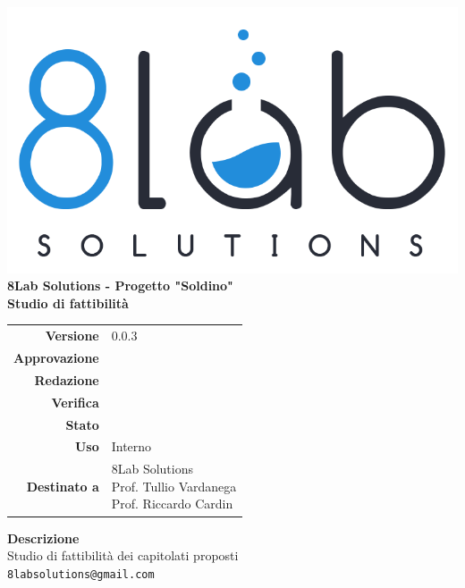 \thispagestyle{empty}
\begin{titlepage}
	\begin{center}
		\includegraphics[scale = 0.3]{images/logo8_crop.png}\\
		\large \textbf{8Lab Solutions - Progetto "Soldino"} \\
		\vfill
		\Huge \textbf{Studio di fattibilità}
		\vspace*{\fill}
        
        \vfill
        \large
        \begin{tabular}{r|l}
                        \textbf{Versione} & 0.0.3\\
                        \textbf{Approvazione} &\\
                        \textbf{Redazione} &\\
                        \textbf{Verifica} &\\
                        \textbf{Stato} &\\
                        \textbf{Uso} & Interno\\
                        \textbf{Destinato a} & \parbox[t]{5cm}{8Lab Solutions
                        \\Prof. Tullio Vardanega\\Prof. Riccardo Cardin}
                \end{tabular}
                \vfill
                \normalsize
                \textbf{Descrizione}\\
                Studio di fattibilità dei capitolati proposti\\
                \vfill
                \small
                \texttt{8labsolutions@gmail.com}
	\end{center}
\end{titlepage}